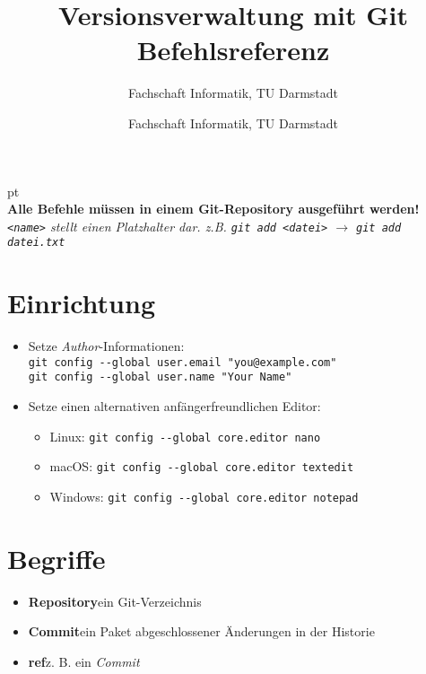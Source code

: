 \documentclass[accentcolor=tud8b,colorbacktitle,12pt]{tudexercise}
\author{Fachschaft Informatik, TU Darmstadt}
\begin{document}
\title{Versionsverwaltung mit Git\\Befehlsreferenz}
\subtitle{Fachschaft Informatik, TU Darmstadt}
\maketitle

 pt\\
\textbf{Alle Befehle müssen in einem Git-Repository ausgeführt werden!}\\
\textit{\lstinline|<name>| stellt einen Platzhalter dar. z.B. \lstinline|git add <datei>| $\rightarrow$ \lstinline|git add datei.txt|}
\section*{Einrichtung}
\begin{itemize}
	\item Setze \textit{Author}-Informationen:\\
	\lstinline|git config --global user.email "you@example.com"|\\
	\lstinline|git config --global user.name "Your Name"|

	\item Setze einen alternativen anfängerfreundlichen Editor:
	\begin{itemize}
		\item Linux: \tab\lstinline|git config --global core.editor nano|
		\item macOS: \tab\lstinline|git config --global core.editor textedit|
		\item Windows: \tab\lstinline|git config --global core.editor notepad|
	\end{itemize}
\end{itemize}

\section*{Begriffe}
\begin{itemize}
	\item \textbf{Repository}\tab ein Git-Verzeichnis
	\item \textbf{Commit}\tab ein Paket abgeschlossener Änderungen in der Historie
	\item \textbf{ref}\tab z. B. ein \textit{Commit}
\end{itemize}
\end{document}
